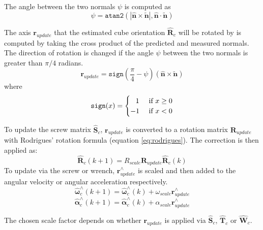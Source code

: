 			The angle between the two normals $\psi$ is computed as
			\begin{equation}
				\psi = \texttt{atan2}(|\hat{\mathbf{n}}\times\tilde{\mathbf{n}}|,\hat{\mathbf{n}}\cdot\tilde{\mathbf{n}})
			\end{equation}
			
			The axis $\mathbf{r}_{update}$ that the estimated cube orientation $\hat{\mathbf{R}}_c$ will be rotated by is computed by taking the cross product of the predicted and measured normals. The direction of rotation is changed if the angle $\psi$ between the two normals is greater than $\pi/4$ radians.
			\begin{equation}
				\mathbf{r}_{update} = \texttt{sign}\left(\frac{\pi}{4}-\psi \right)(\hat{\mathbf{n}} \times \tilde{\mathbf{n}}) 
			\end{equation}
			where
			\begin{equation}
			\texttt{sign}(x) = 
				\begin{cases} 
				      \hspace{0.75em} 1    \hfill & \text{ if $x \geq 0$} \\
				      \hfill -1 \hfill & \text{ if $x < 0$} \\
				\end{cases} 
			\end{equation}
		
			To update the screw matrix $\hat{\mathbf{S}}_c$, $\mathbf{r}_{update}$ is converted to a rotation matrix $\mathbf{R}_{update}$ with Rodrigues' rotation formula (equation \ref{eq:rodrigues}). The correction is then applied as:
			\begin{equation}
				\hat{\mathbf{R}}_{c}(k+1) = R_{scale}\mathbf{R}_{update}\hat{\mathbf{R}}_{c}(k)
			\end{equation}
			To update via the screw or wrench, $\mathbf{r}_{update}^{\wedge}$ is scaled and then added to the angular velocity or angular acceleration respectively.
			\begin{equation}
				\hat{\bm{\omega}}_{c}^{\wedge}(k+1) = \hat{\bm{\omega}}_{c}^{\wedge}(k) + \omega_{scale}\mathbf{r}_{update}^{\wedge}
			\end{equation}
			\begin{equation}
				\hat{\bm{\alpha}}_{c}^{\wedge}(k+1) = \hat{\bm{\alpha}}_{c}^{\wedge}(k) + 	\alpha_{scale}\mathbf{r}_{update}^{\wedge}
			\end{equation}
			
			The chosen scale factor depends on whether $\mathbf{r}_{update}$ is applied via $\hat{\mathbf{S}}_c$, $\hat{\mathbf{T}}_c$ or $\hat{\mathbf{W}}_c$.
				
